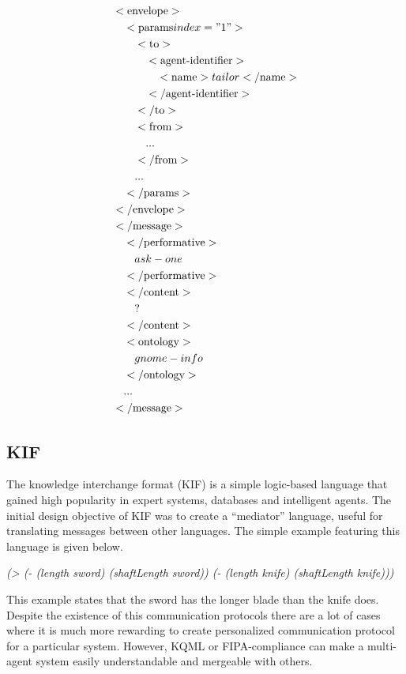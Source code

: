 \begin{align*}
  &<\text{envelope}> \\
  &\quad <\text{params} index ="1"> \\
  &\quad \quad <\text{to}> \\
  &\quad \quad \quad <\text{agent-identifier}>\\
  &\quad \quad \quad \quad <\text{name}> tailor </\text{name}>\\
  &\quad \quad \quad </\text{agent-identifier}>\\
  &\quad \quad </\text{to}> \\
  &\quad \quad <\text{from}> \\
  &\quad \quad \quad ... \\
  &\quad \quad </\text{from}> \\
  &\quad \quad ...\\
  &\quad </\text{params}>\\
  &</\text{envelope}>\\
  &</\text{message}>\\
  &\quad </\text{performative}>\\
  &\quad \quad ask-one \\
  &\quad </\text{performative}>\\
  &\quad </\text{content}>\\
  &\quad \quad ? \\
  &\quad </\text{content}>\\
  &\quad <\text{ontology}>\\
  &\quad \quad gnome-info \\
  &\quad </\text{ontology}>\\
  &\quad ...\\
  &</\text{message}>\\
\end{align*}

\subsection{KIF}
The knowledge interchange format (KIF) is a simple logic-based language that gained high popularity in  expert systems, databases and intelligent agents. The initial design objective of KIF was to create a ``mediator'' language, useful for translating messages between other languages. The simple example featuring this language is given below.
\begin{center}
\textit{(> (- (length sword) (shaftLength sword)) (- (length knife) (shaftLength knife))) }
\end{center}
This example states that the sword has the longer blade than the knife does.
Despite the existence of this communication protocols there are a lot of cases where it is much more rewarding to create personalized communication protocol for a particular system. However, KQML or FIPA-compliance can make a multi-agent system easily understandable and mergeable with others.
